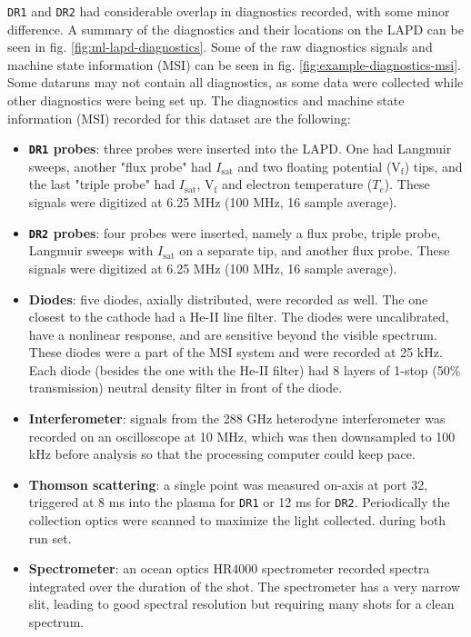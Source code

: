 \texttt{DR1} and \texttt{DR2} had considerable overlap in diagnostics recorded, with some minor difference. A summary of the diagnostics and their locations on the LAPD can be seen in fig. \ref{fig:ml-lapd-diagnostics}. Some of the raw diagnostics signals and machine state information (MSI) can be seen in fig. \ref{fig:example-diagnostics-msi}. Some dataruns may not contain all diagnostics, as some data were collected while other diagnostics were being set up. The diagnostics and machine state information (MSI) recorded for this dataset are the following:
\begin{itemize}
	\item \textbf{\texttt{DR1} probes}: three probes were inserted into the LAPD. One had Langmuir sweeps, another "flux probe" had $I_\text{sat}$ and two floating potential (V$_\text{f}$) tips, and the last "triple probe" had $I_\text{sat}$, V$_\text{f}$ and electron temperature ($T_e$). These signals were digitized at 6.25 MHz (100 MHz, 16 sample average).
	\item \textbf{\texttt{DR2} probes}: four probes were inserted, namely a flux probe, triple probe, Langmuir sweeps with $I_\text{sat}$ on a separate tip, and another flux probe. These signals were digitized at 6.25 MHz (100 MHz, 16 sample average).
	\item \textbf{Diodes}: five diodes, axially distributed, were recorded as well. The one closest to the cathode had a He-II line filter. The diodes were uncalibrated, have a nonlinear response, and are sensitive beyond the visible spectrum. These diodes were a part of the MSI system and were recorded at 25 kHz. Each diode (besides the one with the He-II filter) had 8 layers of 1-stop (50\% transmission) neutral density filter in front of the diode.
	\item \textbf{Interferometer}: signals from the 288 GHz heterodyne interferometer was recorded on an oscilloscope at 10 MHz, which was then downsampled to 100 kHz before analysis so that the processing computer could keep pace.
	\item \textbf{Thomson scattering}: a single point was measured on-axis at port 32, triggered at 8 ms into the plasma for \texttt{DR1} or 12 ms for \texttt{DR2}. Periodically the collection optics were scanned to maximize the light collected. during both run set.
	\item \textbf{Spectrometer}: an ocean optics HR4000 spectrometer recorded spectra integrated over the duration of the shot. The spectrometer has a very narrow slit, leading to good spectral resolution but requiring many shots for a clean spectrum.

\end{itemize}
